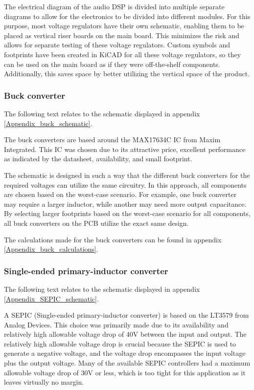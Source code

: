 The electrical diagram of the audio DSP is divided into multiple separate diagrams to allow for the electronics to be divided into different modules. For this purpose, most voltage regulators have their own schematic, enabling them to be placed as vertical riser boards on the main board. This minimizes the risk and allows for separate testing of these voltage regulators. Custom symbols and footprints have been created in KiCAD for all these voltage regulators, so they can be used on the main board as if they were off-the-shelf components. Additionally, this saves space by better utilizing the vertical space of the product.

\subsubsection{Buck converter}
The following text relates to the schematic displayed in appendix \ref{Appendix_buck_schematic}.

The buck converters are based around the MAX17634C IC from Maxim Integrated. This IC was chosen due to its attractive price, excellent performance as indicated by the datasheet, availability, and small footprint.

The schematic is designed in such a way that the different buck converters for the required voltages can utilize the same circuitry. In this approach, all components are chosen based on the worst-case scenario. For example, one buck converter may require a larger inductor, while another may need more output capacitance. By selecting larger footprints based on the worst-case scenario for all components, all buck converters on the PCB utilize the exact same design.

The calculations made for the buck converters can be found in appendix \ref{Appendix_buck_calculations}.

\subsubsection{Single-ended primary-inductor converter}
The following text relates to the schematic displayed in appendix \ref{Appendix_SEPIC_schematic}.

A SEPIC (Single-ended primary-inductor converter) is based on the LT3579 from Analog Devices. This choice was primarily made due to its availability and relatively high allowable voltage drop of 40V between the input and output. The relatively high allowable voltage drop is crucial because the SEPIC is used to generate a negative voltage, and the voltage drop encompasses the input voltage plus the output voltage. Many of the available SEPIC controllers had a maximum allowable voltage drop of 30V or less, which is too tight for this application as it leaves virtually no margin.

